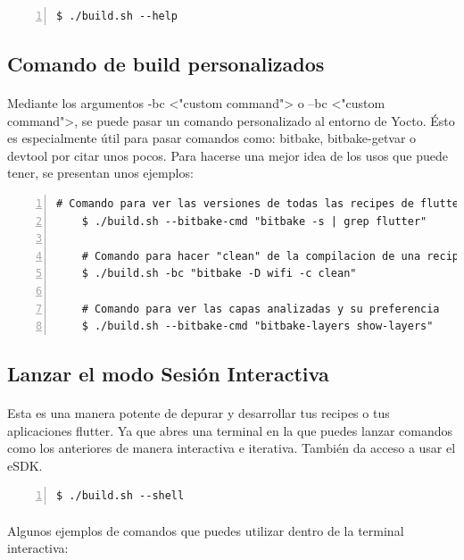 \begin{lstlisting}[style=consola, numbers=left]
    $ ./build.sh --help
\end{lstlisting}

\subsection{Comando de build personalizados}

\paragraph{}Mediante los argumentos -bc <"custom command"> o --bc <"custom command">,
se puede pasar un comando personalizado al entorno de Yocto. Ésto es especialmente útil
para pasar comandos como: bitbake, bitbake-getvar o devtool por citar unos pocos. Para
hacerse una mejor idea de los usos que puede tener, se presentan unos ejemplos:

\begin{lstlisting}[style=consola, numbers=left]
    # Comando para ver las versiones de todas las recipes de flutter
    $ ./build.sh --bitbake-cmd "bitbake -s | grep flutter"

    # Comando para hacer "clean" de la compilacion de una recipe especifica
    $ ./build.sh -bc "bitbake -D wifi -c clean"

    # Comando para ver las capas analizadas y su preferencia
    $ ./build.sh --bitbake-cmd "bitbake-layers show-layers"
\end{lstlisting}

\subsection{Lanzar el modo Sesión Interactiva}

\paragraph{}Esta es una manera potente de depurar y desarrollar tus recipes o tus
aplicaciones flutter. Ya que abres una terminal en la que puedes lanzar comandos como
los anteriores de manera interactiva e iterativa. También da acceso a usar el \gls{eSDK}.

\begin{lstlisting}[style=consola, numbers=left]
    $ ./build.sh --shell
\end{lstlisting}

\paragraph{}Algunos ejemplos de comandos que puedes utilizar dentro de la terminal interactiva:

